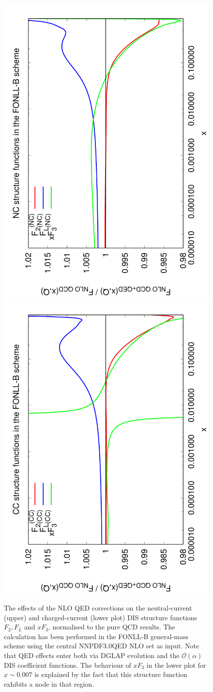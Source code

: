 \begin{figure}[!ht]
\centering
\includegraphics[width=0.7\columnwidth,angle=270]{figs/NLOQEDCorrections_NC.pdf}
\includegraphics[width=0.7\columnwidth,angle=270]{figs/NLOQEDCorrections_CC.pdf}
\caption{The effects of the NLO QED corrections on the neutral-current
  (upper) and charged-current (lower plot) DIS structure functions
  $F_2, F_L$ and $xF_3$, normalised to the pure QCD results.  The
  calculation has been performed in the FONLL-B general-mass scheme
  using the central NNPDF3.0QED NLO set as input.  Note that QED
  effects enter both via DGLAP evolution and the $\mathcal{O}(\alpha)$
  DIS coefficient functions. The behaviour of $xF_3$ in the lower plot
  for $x\sim 0.007$ is explained by the fact that this structure
  function exhibits a node in that region.}\label{fig:StructFuncs}
\end{figure}
